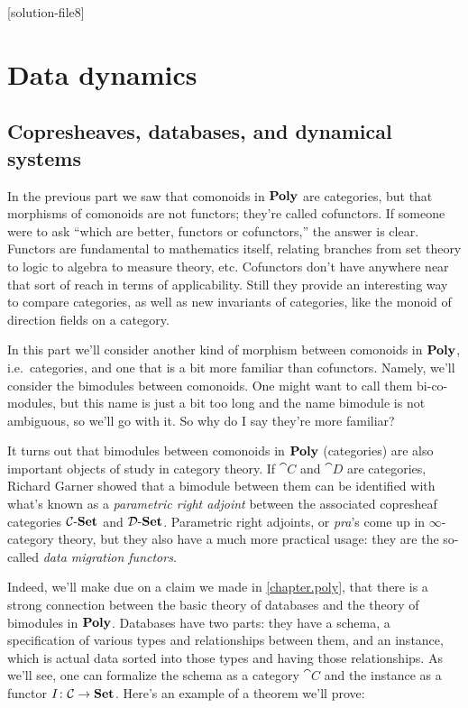 \documentclass[Book-Poly]{subfiles}
\begin{document}
\setcounter{chapter}{7}%
[solution-file8]

\part{Data dynamics}\label{chapter.bimod} 

\chapter{Copresheaves, databases, and dynamical systems}\label{sec.copresheaves_data_ds}

In the previous part we saw that comonoids in $\mathbf{Poly}$ are categories, but that morphisms of comonoids are not functors; they're called cofunctors. If someone were to ask ``which are better, functors or cofunctors,'' the answer is clear. Functors are fundamental to mathematics itself, relating branches from set theory to logic to algebra to measure theory, etc. Cofunctors don't have anywhere near that sort of reach in terms of applicability. Still they provide an interesting way to compare categories, as well as new invariants of categories, like the monoid of direction fields on a category.

In this part we'll consider another kind of morphism between comonoids in $\mathbf{Poly}$, i.e.\ categories, and one that is a bit more familiar than cofunctors. Namely, we'll consider the bimodules between comonoids. One might want to call them bi-co-modules, but this name is just a bit too long and the name bimodule is not ambiguous, so we'll go with it. So why do I say they're more familiar?

It turns out that bimodules between comonoids in $\mathbf{Poly}$ (categories) are also important objects of study in category theory. If $\cat{C}$ and $\cat{D}$ are categories, Richard Garner showed that a bimodule between them can be identified with what's known as a \emph{parametric right adjoint} between the associated copresheaf categories $\mathcal{C}\textnormal{-}\mathbf{Set}$ and $\mathcal{D}\textnormal{-}\mathbf{Set}$. Parametric right adjoints, or \emph{pra}'s come up in $\infty$-category theory, but they also have a much more practical usage: they are the so-called \emph{data migration functors}.

Indeed, we'll make due on a claim we made in \cref{chapter.poly}, that there is a strong connection between the basic theory of databases and the theory of bimodules in $\mathbf{Poly}$. Databases have two parts: they have a schema, a specification of various types and relationships between them, and an instance, which is actual data sorted into those types and having those relationships. As we'll see, one can formalize the schema as a category $\cat{C}$ and the instance as a functor $I\colon\mathcal{C}\to\mathbf{Set}$. Here's an example of a theorem we'll prove:
\end{document}
